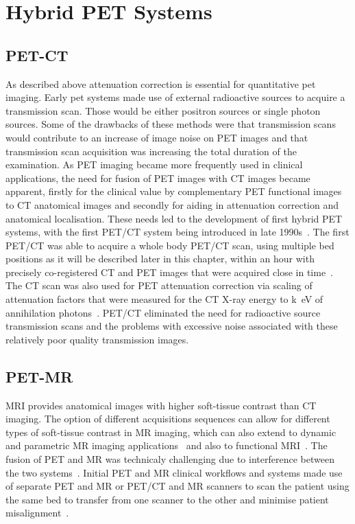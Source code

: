 \section{Hybrid PET Systems}
\subsection{PET-CT}
As described above attenuation correction is essential for quantitative \gls{pet} imaging. Early \gls{pet} systems made use of external radioactive sources to acquire a transmission scan. Those would be either positron sources or single photon sources. Some of the drawbacks of these methods were that transmission scans would contribute to an increase of image noise on PET images and that transmission scan acquisition was increasing the total duration of the examination.
As PET imaging became more frequently used in clinical applications, the need for fusion of PET images with CT images became apparent, firstly for the clinical value by complementary PET functional images to CT anatomical images and secondly for aiding in attenuation correction and anatomical localisation. These needs led to the development of first hybrid PET systems, with the first PET/CT system being introduced in late 1990s~\cite{Townsend2008}.
The first PET/CT was able to acquire a whole body PET/CT scan, using multiple bed positions as it will be described later in this chapter, within an hour with precisely co-registered CT and PET images that were acquired close in time~\cite{Beyer2000}. The CT scan was also used for PET attenuation correction via scaling of attenuation factors that were measured for the CT X-ray energy to \si{k\electronvolt} of annihilation photons~\cite{Kinahan1998}. PET/CT eliminated the need for radioactive source transmission scans and the problems with excessive noise associated with these relatively poor quality transmission images.

\subsection{PET-MR}
\label{sec:PET_MR_Systems}
MRI provides anatomical images with higher soft-tissue contrast than CT imaging. The option of different acquisitions sequences can allow for different types of soft-tissue contrast in MR imaging, which can also extend to dynamic and parametric MR imaging applications~\cite{Besson2020} and also to functional MRI~\cite{Kolb2012}.
The fusion of PET and MR was technicaly challenging due to interference between the two systems~\cite{Disselhorst2014}.
Initial PET and MR clinical workflows and systems made use of separate PET and MR or PET/CT and MR scanners to scan the patient using the same bed to transfer from one scanner to the other and minimise patient misalignment~\cite{Zaidi2011,Veit-Haibach2013}.

